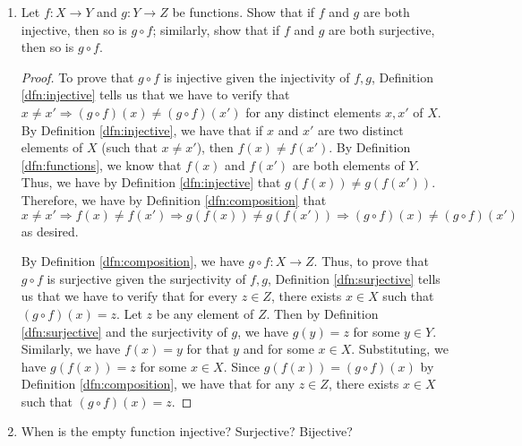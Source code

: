 \documentclass[../main.tex]{subfiles}
\begin{document}
\begin{enumerate}[ref={\thesection.\arabic*}]
\begin{proof}
        \begin{align*}
            (g\circ f)(x) &= g(f(x))\\
            &= \tilde{g}(f(x))\\
            &= \tilde{g}(\tilde{f}(x))\\
            &= (\tilde{g}\circ\tilde{f})(x)
        \end{align*}
        as desired.
    \end{proof}
    \item \label{exr:3.3.2}Let $f:X\to Y$ and $g:Y\to Z$ be functions. Show that if $f$ and $g$ are both injective, then so is $g\circ f$; similarly, show that if $f$ and $g$ are both surjective, then so is $g\circ f$.
    \begin{proof}
        To prove that $g\circ f$ is injective given the injectivity of $f,g$, Definition \ref{dfn:injective} tells us that we have to verify that $x\neq x' \Longrightarrow (g\circ f)(x)\neq(g\circ f)(x')$ for any distinct elements $x,x'$ of $X$. By Definition \ref{dfn:injective}, we have that if $x$ and $x'$ are two distinct elements of $X$ (such that $x\neq x'$), then $f(x)\neq f(x')$. By Definition \ref{dfn:functions}, we know that $f(x)$ and $f(x')$ are both elements of $Y$. Thus, we have by Definition \ref{dfn:injective} that $g(f(x))\neq g(f(x'))$. Therefore, we have by Definition \ref{dfn:composition} that
        \begin{equation*}
            x\neq x' \Longrightarrow f(x)\neq f(x')
            \Longrightarrow g(f(x))\neq g(f(x'))
            \Longrightarrow (g\circ f)(x)\neq(g\circ f)(x')
        \end{equation*}
        as desired.\par
        By Definition \ref{dfn:composition}, we have $g\circ f:X\to Z$. Thus, to prove that $g\circ f$ is surjective given the surjectivity of $f,g$, Definition \ref{dfn:surjective} tells us that we have to verify that for every $z\in Z$, there exists $x\in X$ such that $(g\circ f)(x)=z$. Let $z$ be any element of $Z$. Then by Definition \ref{dfn:surjective} and the surjectivity of $g$, we have $g(y)=z$ for some $y\in Y$. Similarly, we have $f(x)=y$ for that $y$ and for some $x\in X$. Substituting, we have $g(f(x))=z$ for some $x\in X$. Since $g(f(x))=(g\circ f)(x)$ by Definition \ref{dfn:composition}, we have that for any $z\in Z$, there exists $x\in X$ such that $(g\circ f)(x)=z$.
    \end{proof}
    \item \label{exr:3.3.3}When is the empty function injective? Surjective? Bijective?

\end{enumerate}
\end{document}
